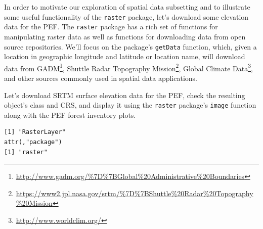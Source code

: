 \documentclass[]{krantz}
\makeatletter
\newenvironment{Shaded}{\begin{snugshade}}{\end{snugshade}}
\newcommand{\DataTypeTok}[1]{\textcolor[rgb]{0.27,0.27,0.27}{#1}}
\newcommand{\DecValTok}[1]{\textcolor[rgb]{0.06,0.06,0.06}{#1}}
\newcommand{\ErrorTok}[1]{\textcolor[rgb]{0.14,0.14,0.14}{\textbf{#1}}}
\newcommand{\KeywordTok}[1]{\textcolor[rgb]{0.27,0.27,0.27}{\textbf{#1}}}
\newcommand{\NormalTok}[1]{#1}
\newcommand{\OperatorTok}[1]{\textcolor[rgb]{0.43,0.43,0.43}{\textbf{#1}}}
\newcommand{\StringTok}[1]{\textcolor[rgb]{0.5,0.5,0.5}{#1}}
\renewcommand{\href}[2]{#2\footnote{\url{#1}}}
\newenvironment{kframe}{%
\medskip{}
\setlength{\fboxsep}{.8em}
 \def\at@end@of@kframe{}%
 \ifinner\ifhmode%
  \def\at@end@of@kframe{\end{minipage}}%
  \begin{minipage}{\columnwidth}%
 \fi\fi%
 \def\FrameCommand##1{\hskip\@totalleftmargin \hskip-\fboxsep
 \colorbox{shadecolor}{##1}\hskip-\fboxsep
     \hskip-\linewidth \hskip-\@totalleftmargin \hskip\columnwidth}%
 \MakeFramed {\advance\hsize-\width
   \@totalleftmargin\z@ \linewidth\hsize
   \@setminipage}}%
 {\par\unskip\endMakeFramed%
 \at@end@of@kframe}
\renewenvironment{Shaded}{\begin{kframe}}{\end{kframe}}
\makeatother
\begin{document}
In order to motivate our exploration of spatial data subsetting and to illustrate some useful functionality of the \texttt{raster} package, let's download some elevation data for the PEF. The \texttt{raster} package has a rich set of functions for manipulating raster data as well as functions for downloading data from open source repositories. We'll focus on the package's \texttt{getData} function, which, given a location in geographic longitude and latitude or location name, will download data from \href{http://www.gadm.org/\%7D\%7BGlobal\%20Administrative\%20Boundaries}{GADM}, \href{https://www2.jpl.nasa.gov/srtm/\%7D\%7BShuttle\%20Radar\%20Topography\%20Mission}{Shuttle Radar Topography Mission}, \href{http://www.worldclim.org/}{Global Climate Data}, and other sources commonly used in spatial data applications.

Let's download SRTM surface elevation data for the PEF, check the resulting object's class and CRS, and display it using the \texttt{raster} package's \texttt{image} function along with the PEF forest inventory plots.

\begin{Shaded}
\end{Shaded}

\begin{verbatim}
[1] "RasterLayer"
attr(,"package")
[1] "raster"
\end{verbatim}
\end{document}
